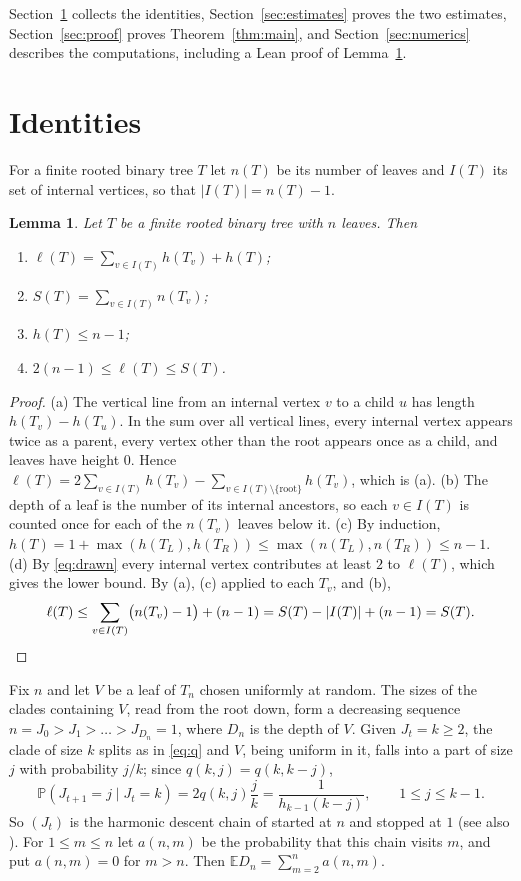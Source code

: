 \documentclass[11pt]{amsart}
\newtheorem{lemma}[theorem]{Lemma}
\theoremstyle{remark}
\numberwithin{equation}{section}
\newcommand{\E}{\mathbb E}
\newcommand{\Pp}{\mathbb P}
\begin{document}
Section~\ref{sec:identities} collects the identities, Section~\ref{sec:estimates} proves the two estimates, Section~\ref{sec:proof} proves Theorem~\ref{thm:main}, and Section~\ref{sec:numerics} describes the computations, including a Lean proof of Lemma~\ref{lem:det}.

\section{Identities}\label{sec:identities}

For a finite rooted binary tree $T$ let $n(T)$ be its number of leaves and $I(T)$ its set of internal vertices, so that $|I(T)|=n(T)-1$.

\begin{lemma}\label{lem:det}
Let $T$ be a finite rooted binary tree with $n$ leaves. Then
\begin{enumerate}[label=\textup{(\alph*)}]
\item $\ell(T)=\sum_{v\in I(T)}h(T_v)+h(T)$;
\item $S(T)=\sum_{v\in I(T)}n(T_v)$;
\item $h(T)\le n-1$;
\item $2(n-1)\le\ell(T)\le S(T)$.
\end{enumerate}
\end{lemma}

\begin{proof}
(a) The vertical line from an internal vertex $v$ to a child $u$ has length $h(T_v)-h(T_u)$. In the sum over all vertical lines, every internal vertex appears twice as a parent, every vertex other than the root appears once as a child, and leaves have height $0$. Hence $\ell(T)=2\sum_{v\in I(T)}h(T_v)-\sum_{v\in I(T)\setminus\{\mathrm{root}\}}h(T_v)$, which is (a).
(b) The depth of a leaf is the number of its internal ancestors, so each $v\in I(T)$ is counted once for each of the $n(T_v)$ leaves below it.
(c) By induction, $h(T)=1+\max(h(T_L),h(T_R))\le\max(n(T_L),n(T_R))\le n-1$.
(d) By \eqref{eq:drawn} every internal vertex contributes at least $2$ to $\ell(T)$, which gives the lower bound. By (a), (c) applied to each $T_v$, and (b),
\[
 \ell(T)\le\sum_{v\in I(T)}\bigl(n(T_v)-1\bigr)+(n-1)=S(T)-|I(T)|+(n-1)=S(T).\qedhere
\]
\end{proof}

Fix $n$ and let $V$ be a leaf of $T_n$ chosen uniformly at random. The sizes of the clades containing $V$, read from the root down, form a decreasing sequence $n=J_0>J_1>\dots>J_{D_n}=1$, where $D_n$ is the depth of $V$. Given $J_t=k\ge2$, the clade of size $k$ splits as in \eqref{eq:q} and $V$, being uniform in it, falls into a part of size $j$ with probability $j/k$; since $q(k,j)=q(k,k-j)$,
\begin{equation}\label{eq:hd}
 \Pp(J_{t+1}=j\mid J_t=k)=2q(k,j)\frac jk=\frac1{h_{k-1}(k-j)},\qquad 1\le j\le k-1.
\end{equation}
So $(J_t)$ is the harmonic descent chain of \cite{AJL24} started at $n$ and stopped at $1$ (see also \cite[Section 3.1]{AJ23}). For $1\le m\le n$ let $a(n,m)$ be the probability that this chain visits $m$, and put $a(n,m)=0$ for $m>n$. Then $\E D_n=\sum_{m=2}^na(n,m)$.
\end{document}
